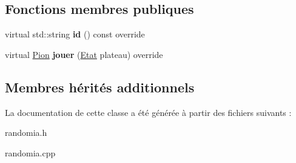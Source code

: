 \subsection*{Fonctions membres publiques}
\begin{DoxyCompactItemize}
\item 
virtual std\+::string {\bfseries id} () const override\hypertarget{classRandomIA_a293e1635b96e7471cc105f0e421543db}{}\label{classRandomIA_a293e1635b96e7471cc105f0e421543db}

\item 
virtual \hyperlink{structPion}{Pion} {\bfseries jouer} (\hyperlink{structEtat}{Etat} plateau) override\hypertarget{classRandomIA_a5e64b0d2e5ee8dcae31f4fbae8799dc3}{}\label{classRandomIA_a5e64b0d2e5ee8dcae31f4fbae8799dc3}

\end{DoxyCompactItemize}
\subsection*{Membres hérités additionnels}


La documentation de cette classe a été générée à partir des fichiers suivants \+:\begin{DoxyCompactItemize}
\item 
randomia.\+h\item 
randomia.\+cpp\end{DoxyCompactItemize}
